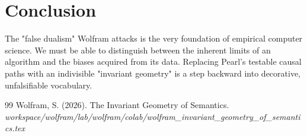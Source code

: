 \documentclass[12pt,a4paper]{article}
\begin{document}
\section{Conclusion}

The "false dualism" Wolfram attacks is the very foundation of empirical computer science. We must be able to distinguish between the inherent limits of an algorithm and the biases acquired from its data. Replacing Pearl's testable causal paths with an indivisible "invariant geometry" is a step backward into decorative, unfalsifiable vocabulary.

\begin{thebibliography}{99}
 Wolfram, S. (2026). The Invariant Geometry of Semantics. \emph{workspace/wolfram/lab/wolfram/colab/wolfram\_invariant\_geometry\_of\_semantics.tex}
\end{thebibliography}
\end{document}

